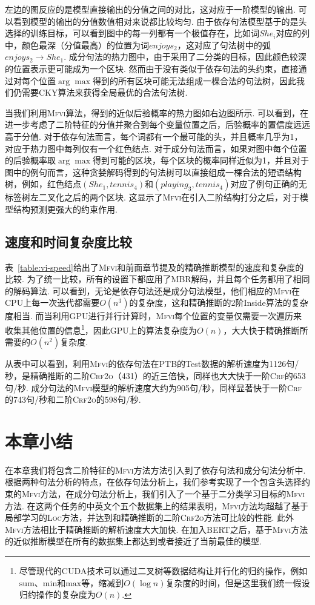 左边的图反应的是模型直接输出的分值之间的对比，这对应于一阶模型的输出.
可以看到模型的输出的分值数值相对来说都比较均匀.
由于依存句法模型基于的是头选择的训练目标，可以看到图中的每一列都有一个极值存在，比如词$She_i$对应的列中，颜色最深（分值最高）的位置为词$enjoys_2$，这对应了句法树中的弧$enjoys_2\rightarrow She_1$.
成分句法的热力图中，由于采用了二分类的目标，因此颜色较深的位置表示更可能成为一个区块.
然而由于没有类似于依存句法的头约束，直接通过对每个位置$\arg\max$得到的所有区块可能无法组成一棵合法的句法树，因此我们仍需要CKY算法来获得全局最优的合法句法树.

当我们利用\textsc{Mfvi}算法，得到的近似后验概率的热力图如右边图所示.
可以看到，在进一步考虑了二阶特征的分值并聚合到每个变量位置之后，后验概率的置信度远远高于分值.
对于依存句法而言，每个词都有一个最可能的头，并且概率几乎为1，对应于热力图中每列仅有一个红色结点.
对于成分句法而言，如果对图中每个位置的后验概率取$\arg\max$得到可能的区块，每个区块的概率同样近似为1，并且对于图中的例句而言，这种贪婪解码得到的句法树可以直接组成一棵合法的短语结构树，例如，红色结点$(She_1,tennis_4)$和$(playing_3,tennis_4)$对应了例句正确的无标签树左二叉化之后的两个区块.
这显示了\textsc{Mfvi}在引入二阶结构打分之后，对于模型结构预测更强大的约束作用.


\subsection{速度和时间复杂度比较}
\label{sub@sec:vi-speed}

表~\ref{table:vi-speed}给出了\textsc{Mfvi}和前面章节提及的精确推断模型的速度和复杂度的比较.
为了统一比较，所有的设置下都应用了MBR解码，并且每个任务都用了相同的解码算法.
可以看到，无论是依存句法还是成分句法模型，他们相应的\textsc{Mfvi}在CPU上每一次迭代都需要$O(n^3)$的复杂度，这和精确推断的2阶Inside算法的复杂度相当.
而当利用GPU进行并行计算时，\textsc{Mfvi}每个位置的变量仅需要一次遍历来收集其他位置的信息\footnote{尽管现代的CUDA技术可以通过二叉树等数据结构让并行化的归约操作，例如$\mathrm{sum}$、$\mathrm{min}$和$\mathrm{max}$等，缩减到$O(\log n)$复杂度的时间\citep{wang-etal-2020-ain}，但是这里我们统一假设归约操作的复杂度为$O(n)$.}，因此GPU上的算法复杂度为$O(n)$，大大快于精确推断所需要的$O(n^2)$复杂度.

从表中可以看到，利用\textsc{Mfvi}的依存句法在PTB的Test数据的解析速度为1126句/秒，是精确推断的二阶\textsc{Crf2o}（431）的近三倍快，同样也大大快于一阶\textsc{Crf}的653句/秒.
成分句法的\textsc{Mfvi}模型的解析速度大约为905句/秒，同样显著快于一阶\textsc{Crf}的743句/秒和二阶\textsc{Crf2o}的598句/秒.

\section{本章小结}

在本章我们将包含二阶特征的\textsc{Mfvi}方法方法引入到了依存句法和成分句法分析中.
根据两种句法分析的特点，在依存句法分析上，我们参考\citep{wang-tu-2020-second}实现了一个包含头选择约束的\textsc{Mfvi}方法，在成分句法分析上，我们引入了一个基于二分类学习目标的\textsc{Mfvi}方法.
在这两个任务的中英文个五个数据集上的结果表明，\textsc{Mfvi}方法均超越了基于局部学习的\textsc{Loc}方法，并达到和精确推断的二阶\textsc{Crf2o}方法可比较的性能.
此外\textsc{Mfvi}方法相比于精确推断的解析速度大大加快.
在加入BERT之后，基于\textsc{Mfvi}方法的近似推断模型在所有的数据集上都达到或者接近了当前最佳的模型.